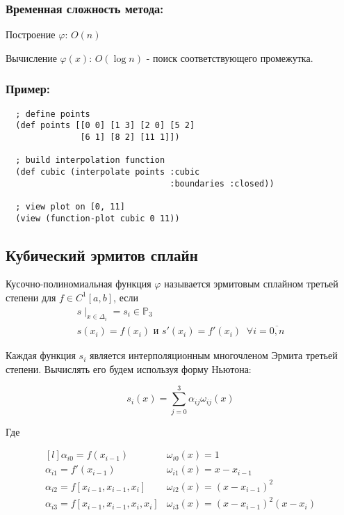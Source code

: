 \subsubsection{Временная сложность метода:}

Построение $\varphi$: $O(n)$

Вычисление $\varphi(x)$: $O(\log n)$ - поиск соответствующего промежутка.

\subsubsection{Пример:}

\begin{verbatim}
  ; define points
  (def points [[0 0] [1 3] [2 0] [5 2] 
               [6 1] [8 2] [11 1]])

  ; build interpolation function
  (def cubic (interpolate points :cubic 
                                 :boundaries :closed))

  ; view plot on [0, 11]
  (view (function-plot cubic 0 11))
\end{verbatim}



\subsection{Кубический эрмитов сплайн}

Кусочно-полиномиальная функция $\varphi$ называется эрмитовым сплайном третьей степени для $f \in C^1[a, b]$, если
\begin{equation}
  \begin{gathered}
    s\mid_{x\in \Delta_i} = s_i \in \mathbb{P}_3 \\
      s(x_i) = f(x_i) \text{ и } s'(x_i) = f'(x_i) \;\; \forall i = \overline{0,n}
  \end{gathered}
\end{equation}

Каждая функция $s_i$ является интерполяционным многочленом Эрмита третьей степени. Вычислять его будем используя форму Ньютона:

\begin{equation}
  s_i(x) = \sum_{j=0}^3 \alpha_{ij} \omega_{ij}(x)
\end{equation}

\noindent Где

\begin{equation}
  \begin{matrix*}[l]
    \alpha_{i0} = f(x_{i-1}) & \omega_{i0}(x) = 1\\
    \alpha_{i1} = f'(x_{i-1}) & \omega_{i1}(x) = x - x_{i-1} \\
    \alpha_{i2} = f[x_{i-1}, x_{i-1}, x_i] & \omega_{i2}(x) = (x - x_{i-1})^2 \\
    \alpha_{i3} = f[x_{i-1}, x_{i-1}, x_i, x_i] & \omega_{i3}(x) =  (x - x_{i-1})^2(x-x_i)
  \end{matrix*}
\end{equation}

